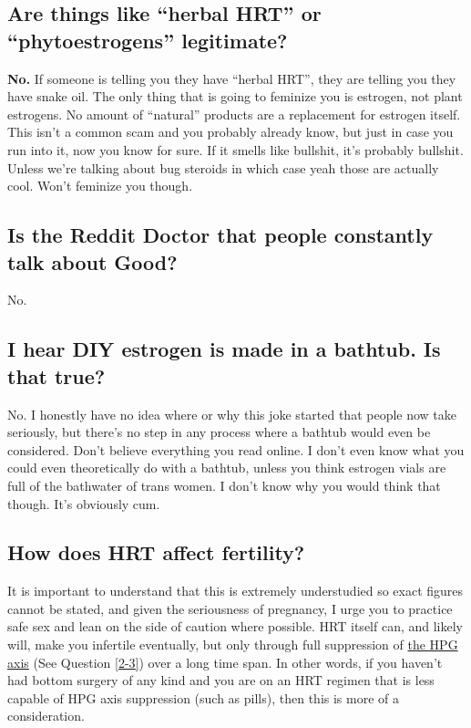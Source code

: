 \documentclass{article}
\begin{document}
\subsection{Are things like “herbal HRT” or “phytoestrogens” legitimate?}

\textbf{No.} If someone is telling you they have “herbal HRT”, they are telling you they have snake oil. The only thing that is going to feminize you is estrogen, not plant estrogens. No amount of “natural” products are a replacement for estrogen itself. This isn’t a common scam and you probably already know, but just in case you run into it, now you know for sure. If it smells like bullshit, it’s probably bullshit. Unless we’re talking about bug steroids in which case yeah those are actually cool. Won’t feminize you though.

\subsection{Is the Reddit Doctor that people constantly talk about Good?}

No.

\subsection{I hear DIY estrogen is made in a bathtub. Is that true?}

No. I honestly have no idea where or why this joke started that people now take seriously, but there’s no step in any process where a bathtub would even be considered. Don’t believe everything you read online. I don’t even know what you could even theoretically do with a bathtub, unless you think estrogen vials are full of the bathwater of trans women. I don’t know why you would think that though. It’s obviously cum.

\subsection{How does HRT affect fertility?}\label{11-42}

It is important to understand that this is extremely understudied so exact figures cannot be stated, and given the seriousness of pregnancy, I urge you to practice safe sex and lean on the side of caution where possible. HRT itself can, and likely will, make you infertile eventually, but only through full suppression of \href{https://en.wikipedia.org/wiki/Hypothalamic-pituitary-gonadal_axis}{the HPG axis} (See Question \ref{2-3}) over a long time span. In other words, if you haven't had bottom surgery of any kind and you are on an HRT regimen that is less capable of HPG axis suppression (such as pills), then this is more of a consideration.
\end{document}
